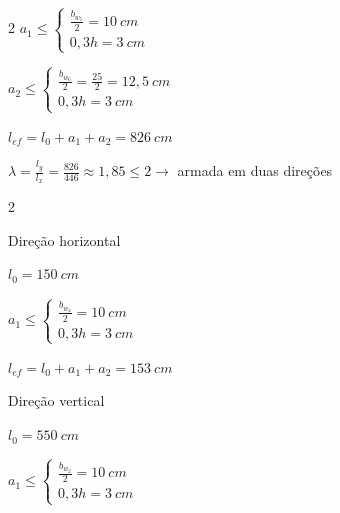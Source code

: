 \begin{resposta}
\begin{enumerate}
\begin{enumerate}
\begin{multicols}{2}
            $a_1 \leq \begin{cases}
                \frac{b_{w_5}}{2} = 10 \ cm \\
                0,3h = 3 \ cm
            \end{cases}$

            $a_2 \leq \begin{cases}
                \frac{b_{w_6}}{2} = \frac{25}{2} = 12,5 \ cm \\
                0,3 h = 3 \ cm
            \end{cases}$

            $l_{ef}= l_0 +a_1+a_2 = 826 \ cm$
        \end{multicols}

            $\lambda = \frac{l_y}{l_x} = \frac{826}{446} \approx 1,85 \leq 2 \to$ armada em duas direções
            
        \end{enumerate}

        \paracasa


        

        \begin{enumerate}
        \begin{multicols}{2}
            \item Direção horizontal

            $l_0= 150 \ cm$

            $a_1 \leq \begin{cases}
                \frac{b_{w_4}}{2} = 10 \ cm \\
                0,3h = 3 \ cm
            \end{cases}$


            \vspace{2cm}

            $l_{ef}= l_0 +a_1+a_2 = 153 \ cm$
            
            \item Direção vertical

            $l_0= 550\ cm$

            $a_1 \leq \begin{cases}
                \frac{b_{w_2}}{2} = 10 \ cm \\ 
                0,3h = 3 \ cm
            \end{cases}$


\end{multicols}
\end{enumerate}
\end{enumerate}
\end{resposta}

